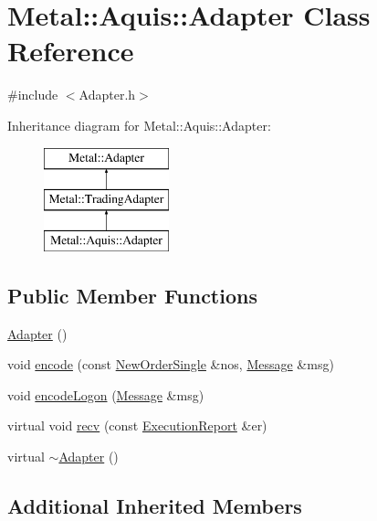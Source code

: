 \hypertarget{classMetal_1_1Aquis_1_1Adapter}{}\section{Metal\+:\+:Aquis\+:\+:Adapter Class Reference}
\label{classMetal_1_1Aquis_1_1Adapter}


{\ttfamily \#include $<$Adapter.\+h$>$}

Inheritance diagram for Metal\+:\+:Aquis\+:\+:Adapter\+:\begin{figure}[H]
\begin{center}
\leavevmode
\includegraphics[height=3.000000cm]{classMetal_1_1Aquis_1_1Adapter}
\end{center}
\end{figure}
\subsection*{Public Member Functions}
\begin{DoxyCompactItemize}
\item 
\hyperlink{classMetal_1_1Aquis_1_1Adapter_a20acfdbceb83248f25dc07ffde16b222}{Adapter} ()
\item 
void \hyperlink{classMetal_1_1Aquis_1_1Adapter_a02231f77b67936968df728ea94837224}{encode} (const \hyperlink{classMetal_1_1NewOrderSingle}{New\+Order\+Single} \&nos, \hyperlink{classMetal_1_1Message}{Message} \&msg)
\item 
void \hyperlink{classMetal_1_1Aquis_1_1Adapter_a3cd85e9d1fd5f69b00d9f55b2ce3120b}{encode\+Logon} (\hyperlink{classMetal_1_1Message}{Message} \&msg)
\item 
virtual void \hyperlink{classMetal_1_1Aquis_1_1Adapter_ab7b5bd731548893899e192907f431553}{recv} (const \hyperlink{namespaceMetal_af4294c176f6aecf9f75e9b106b117aa1}{Execution\+Report} \&er)
\item 
virtual \hyperlink{classMetal_1_1Aquis_1_1Adapter_ac5ba9ce761529573d07804f419d56576}{$\sim$\+Adapter} ()
\end{DoxyCompactItemize}
\subsection*{Additional Inherited Members}


